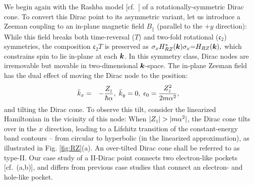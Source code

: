 \documentclass[aps, showpacs, twocolumn, notitlepage, superscriptaddress]{revtex4-1}
\begin{document}
We begin again with the Rashba model [cf.\ ] of a rotationally-symmetric Dirac cone. To convert this Dirac point to its asymmetric variant, 
let us introduce a Zeeman coupling to an in-plane magnetic field $B_\parallel$ (parallel to the $+y$ direction):
While this field breaks both time-reversal ($T$) and two-fold rotational ($\mathfrak{c}_2$) symmetries, the composition $\mathfrak{c}_2T$ is preserved as $\sigma_x H^*_{RZ}(\boldsymbol{k})\sigma_x{=}H_{RZ}(\boldsymbol{k}),$ which constrains spin to lie in-plane at each $\boldsymbol{k}$. In this symmetry class, Dirac nodes are irremovable but movable in two-dimensional $\boldsymbol{k}$-space. The in-plane Zeeman field has the dual effect of moving the Dirac node  to the position:
\begin{eqnarray}
\bar{k}_x & = & -\frac{Z_{\scriptscriptstyle{\parallel}}}{\hbar\alpha},\;\bar{k}_y=0,\;\epsilon_{0}=\frac{Z_{\scriptscriptstyle{\parallel}}^{2}}{2m\alpha^2},\label{whereisdiracpoint}
\end{eqnarray}
and tilting the Dirac cone. To observe this tilt, consider the linearized Hamiltonian in the vicinity of this node: 
When $|\zpar|>|m\alpha^2|$, the Dirac cone tilts over in the $x$ direction, leading to a Lifshitz transition  of the constant-energy band contours -- from circular to hyperbolic (in the linearized approximation), as illustrated in Fig. \ref{fig:RZ}(a). An over-tilted Dirac cone shall be referred to as type-II. Our case study of a II-Dirac point  connects  two electron-like  pockets [cf.\ (a,b)], and  differs from previous case studies\cite{obrien_magnetic_2016,AALG} that connect an electron- and hole-like pocket.
\end{document}
